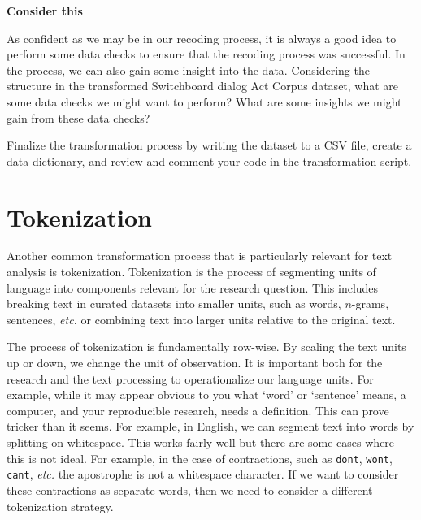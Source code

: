 \documentclass[
  letterpaper,
  DIV=11,
  numbers=noendperiod]{scrreport}
\theoremstyle{definition}
\theoremstyle{remark}
\begin{document}
\begin{tcolorbox}[enhanced jigsaw, breakable, colback=white, rightrule=.15mm, arc=.35mm, left=2mm, toprule=.15mm, leftrule=.75mm, bottomrule=.15mm, opacityback=0]

\textbf{ Consider this}

As confident as we may be in our recoding process, it is always a good
idea to perform some data checks to ensure that the recoding process was
successful. In the process, we can also gain some insight into the data.
Considering the structure in the transformed Switchboard dialog Act
Corpus dataset, what are some data checks we might want to perform? What
are some insights we might gain from these data checks?

\end{tcolorbox}

Finalize the transformation process by writing the dataset to a CSV
file, create a data dictionary, and review and comment your code in the
transformation script.

\hypertarget{sec-td-tokenization}{%
\section{Tokenization}\label{sec-td-tokenization}}

Another common transformation process that is particularly relevant for
text analysis is tokenization. Tokenization is the process of segmenting
units of language into components relevant for the research question.
This includes breaking text in curated datasets into smaller units, such
as words, \(n\)-grams, sentences, \emph{etc.} or combining text into
larger units relative to the original text.

The process of tokenization is fundamentally row-wise. By scaling the
text units up or down, we change the unit of observation. It is
important both for the research and the text processing to
operationalize our language units. For example, while it may appear
obvious to you what `word' or `sentence' means, a computer, and your
reproducible research, needs a definition. This can prove tricker than
it seems. For example, in English, we can segment text into words by
splitting on whitespace. This works fairly well but there are some cases
where this is not ideal. For example, in the case of contractions, such
as \texttt{don\textquotesingle{}t}, \texttt{won\textquotesingle{}t},
\texttt{can\textquotesingle{}t}, \emph{etc.} the apostrophe is not a
whitespace character. If we want to consider these contractions as
separate words, then we need to consider a different tokenization
strategy.
\end{document}
